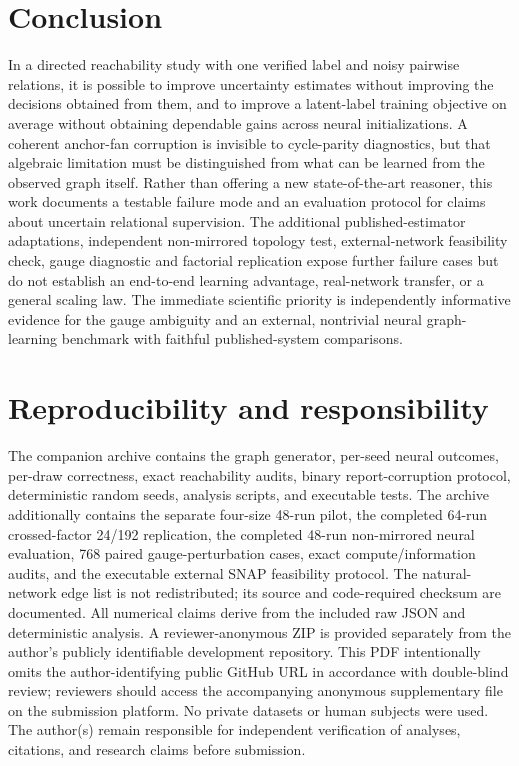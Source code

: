 \documentclass[10pt]{article}
\begin{document}
\section{Conclusion}
In a directed reachability study with one verified label and noisy pairwise relations, it is possible to improve uncertainty estimates without improving the decisions obtained from them, and to improve a latent-label training objective on average without obtaining dependable gains across neural initializations. A coherent anchor-fan corruption is invisible to cycle-parity diagnostics, but that algebraic limitation must be distinguished from what can be learned from the observed graph itself. Rather than offering a new state-of-the-art reasoner, this work documents a testable failure mode and an evaluation protocol for claims about uncertain relational supervision. The additional published-estimator adaptations, independent non-mirrored topology test, external-network feasibility check, gauge diagnostic and factorial replication expose further failure cases but do not establish an end-to-end learning advantage, real-network transfer, or a general scaling law. The immediate scientific priority is independently informative evidence for the gauge ambiguity and an external, nontrivial neural graph-learning benchmark with faithful published-system comparisons.

\section*{Reproducibility and responsibility}
The companion archive contains the graph generator, per-seed neural outcomes, per-draw correctness, exact reachability audits, binary report-corruption protocol, deterministic random seeds, analysis scripts, and executable tests. The archive additionally contains the separate four-size 48-run pilot, the completed 64-run crossed-factor 24/192 replication, the completed 48-run non-mirrored neural evaluation, 768 paired gauge-perturbation cases, exact compute/information audits, and the executable external SNAP feasibility protocol. The natural-network edge list is not redistributed; its source and code-required checksum are documented. All numerical claims derive from the included raw JSON and deterministic analysis. A reviewer-anonymous ZIP is provided separately from the author's publicly identifiable development repository. This PDF intentionally omits the author-identifying public GitHub URL in accordance with double-blind review; reviewers should access the accompanying anonymous supplementary file on the submission platform. No private datasets or human subjects were used. The author(s) remain responsible for independent verification of analyses, citations, and research claims before submission.
\end{document}
